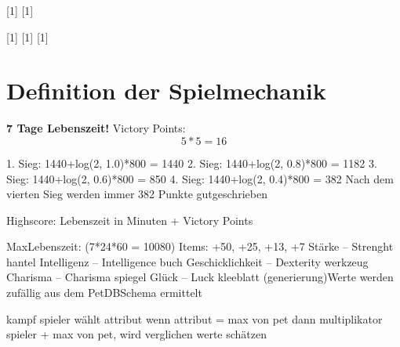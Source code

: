 [1]
[1]

[1]
[1]
[1]


\section{Definition der Spielmechanik} 
\textbf{7 Tage Lebenszeit!}
Victory Points: 
\begin{equation}
5*5=16
\end{equation}







1. Sieg: 1440+log(2, 1.0)*800 = 1440
2. Sieg: 1440+log(2, 0.8)*800 = 1182
3. Sieg: 1440+log(2, 0.6)*800 = 850
4. Sieg: 1440+log(2, 0.4)*800 = 382 Nach dem vierten Sieg werden immer 382 Punkte gutgeschrieben

Highscore: Lebenszeit in Minuten + Victory Points

MaxLebenszeit: (7*24*60 = 10080) 
Items: +50,  +25, +13, +7
Stärke – Strenght 			hantel
Intelligenz – Intelligence 		buch
Geschicklichkeit – Dexterity	werkzeug
Charisma – Charisma		spiegel
Glück – Luck				kleeblatt 
(generierung)Werte werden zufällig aus dem PetDBSchema ermittelt 

kampf 
spieler wählt attribut
wenn attribut = max von pet dann multiplikator
spieler + max von pet, wird verglichen
werte schätzen 

